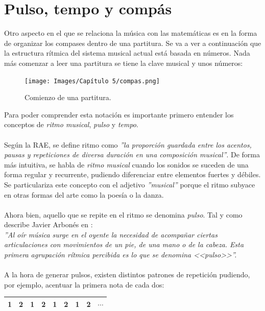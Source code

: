 \documentclass[a4paper, openright, 11pt, titlepage]{report}
\theoremstyle{definition}\newtheorem{defin}[propo]{Definition}
\theoremstyle{definition}\newtheorem{obser}[propo]{Remark}
\theoremstyle{definition}\newtheorem{ejem}[propo]{Ejemplo}
\theoremstyle{definition}\newtheorem{algoritmo}[propo]{Algoritmo}
\begin{document}
\chapter{Pulso, tempo y compás}
Otro aspecto en el que se relaciona la música con las matemáticas es en la forma de organizar los compases dentro de una partitura. Se va a ver a continuación que la estructura rítmica del sistema musical actual está basada en números. Nada más comenzar a leer una partitura se tiene la clave musical y unos números:
\begin{figure}[H]
    \centering
    \texttt{[image: Images/Capítulo 5/compas.png]}
    \caption{Comienzo de una partitura.}
\end{figure}
Para poder comprender esta notación es importante primero entender los conceptos de \textit{ritmo musical}, \textit{pulso} y \textit{tempo}.\\\\
Según la RAE, se define ritmo como \textit{''la proporción guardada entre los acentos, pausas y repeticiones de diversa duración en una composición musical''}. De forma más intuitiva, se habla de \textit{ritmo musical} cuando los sonidos se suceden de una forma regular y recurrente, pudiendo diferenciar entre elementos fuertes y débiles.\\
Se particulariza este concepto con el adjetivo \textit{''musical''} porque el ritmo subyace en otras formas del arte como la poesía o la danza.\\\\
Ahora bien, aquello que se repite en el ritmo se denomina \textit{pulso}. Tal y como describe Javier Arbonés en \cite{libro}:\\
\textit{''Al oír música surge en el oyente la necesidad de acompañar ciertas articulaciones con movimientos de un pie, de una mano o de la cabeza. Esta primera agrupación rítmica percibida es lo que se denomina <<pulso>>''.}\\\\
A la hora de generar pulsos, existen distintos patrones de repetición pudiendo, por ejemplo, acentuar la primera nota de cada dos:
\begin{table}[H]
    \centering
    \begin{tabular}{|c|c|c|c|c|c|c|c|c|}
    \hline
        \cellcolor{acento}1 & 2 & \cellcolor{acento}1 & 2 & \cellcolor{acento}1 & 2 & \cellcolor{acento}1 & 2 & $\cdots$ \\
    \hline
    \end{tabular}
\end{table}
\end{document}
